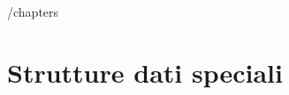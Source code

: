 /chapters%

\ifsubfile
\pagestyle{plain}
\setcounter{chapter}{9}


\fi
\chapter{Strutture dati speciali}

\ifsubfile

\fi
